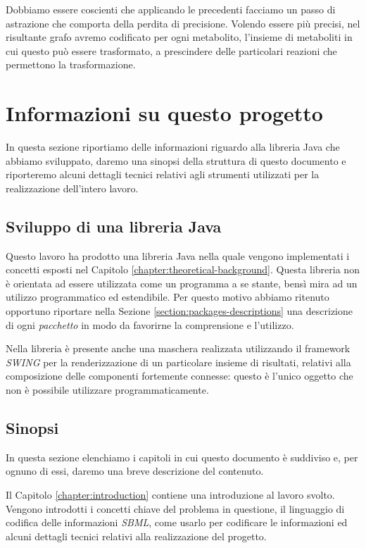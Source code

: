 Dobbiamo essere coscienti che applicando le precedenti facciamo un
passo di astrazione che comporta della perdita di precisione. Volendo
essere pi\`u precisi, nel risultante grafo avremo codificato per ogni
metabolito, l'insieme di metaboliti in cui questo pu\`o essere
trasformato, a prescindere delle particolari reazioni che permettono
la trasformazione.

\section{Informazioni su questo progetto}
In questa sezione riportiamo delle informazioni riguardo alla libreria
Java che abbiamo sviluppato, daremo una sinopsi della struttura di
questo documento e riporteremo alcuni dettagli tecnici relativi agli
strumenti utilizzati per la realizzazione dell'intero lavoro.

\subsection{Sviluppo di una libreria Java}
Questo lavoro ha prodotto una libreria Java nella quale vengono
implementati i concetti esposti nel Capitolo
\ref{chapter:theoretical-background}. Questa libreria non \`e
orientata ad essere utilizzata come un programma a se stante, bens\`i
mira ad un utilizzo programmatico ed estendibile. Per questo motivo
abbiamo ritenuto opportuno riportare nella Sezione
\ref{section:packages-descriptions} una descrizione di ogni
\emph{pacchetto} in modo da favorirne la comprensione e l'utilizzo.

Nella libreria \`e presente anche una maschera realizzata utilizzando
il framework \emph{SWING} per la renderizzazione di un particolare
insieme di risultati, relativi alla composizione delle componenti
fortemente connesse: questo \`e l'unico oggetto che non \`e possibile
utilizzare programmaticamente.

\subsection{Sinopsi}
In questa sezione elenchiamo i capitoli in cui questo documento \`e
suddiviso e, per ognuno di essi, daremo una breve descrizione del
contenuto.

Il Capitolo \ref{chapter:introduction} contiene una introduzione al
lavoro svolto. Vengono introdotti i concetti chiave del problema in
questione, il linguaggio di codifica delle informazioni \emph{SBML},
come usarlo per codificare le informazioni ed alcuni dettagli tecnici
relativi alla realizzazione del progetto.

